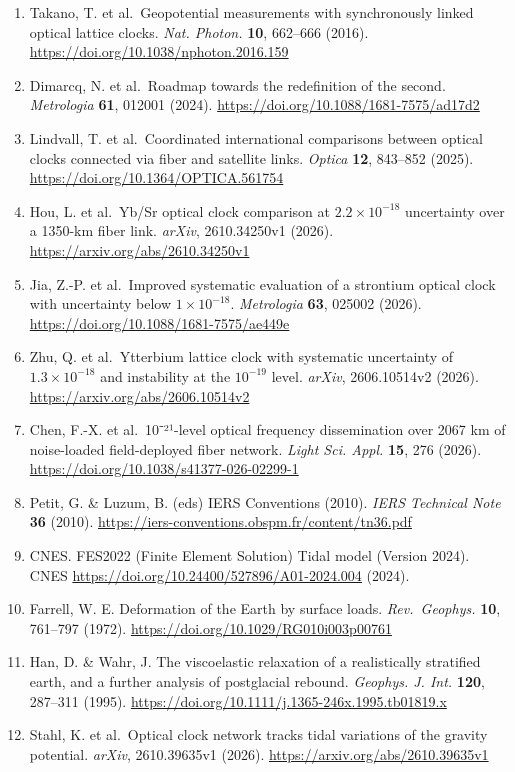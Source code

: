 \documentclass[
  12pt,
  a4paper,
]{article}
\begin{document}
\begin{enumerate}
  \url{https://doi.org/10.1038/s41567-017-0042-3}
\item
  Takano, T. et al.~Geopotential measurements with synchronously linked
  optical lattice clocks. \emph{Nat. Photon.} \textbf{10}, 662--666
  (2016). \url{https://doi.org/10.1038/nphoton.2016.159}
\item
  Dimarcq, N. et al.~Roadmap towards the redefinition of the second.
  \emph{Metrologia} \textbf{61}, 012001 (2024).
  \url{https://doi.org/10.1088/1681-7575/ad17d2}
\item
  Lindvall, T. et al.~Coordinated international comparisons between
  optical clocks connected via fiber and satellite links. \emph{Optica}
  \textbf{12}, 843--852 (2025).
  \url{https://doi.org/10.1364/OPTICA.561754}
\item
  Hou, L. et al.~Yb/Sr optical clock comparison at \(2.2\times10^{-18}\)
  uncertainty over a 1350-km fiber link. \emph{arXiv}, 2610.34250v1
  (2026). \url{https://arxiv.org/abs/2610.34250v1}
\item
  Jia, Z.-P. et al.~Improved systematic evaluation of a strontium
  optical clock with uncertainty below \(1\times10^{-18}\).
  \emph{Metrologia} \textbf{63}, 025002 (2026).
  \url{https://doi.org/10.1088/1681-7575/ae449e}
\item
  Zhu, Q. et al.~Ytterbium lattice clock with systematic uncertainty of
  \(1.3\times 10^{-18}\) and instability at the \(10^{-19}\) level.
  \emph{arXiv}, 2606.10514v2 (2026).
  \url{https://arxiv.org/abs/2606.10514v2}
\item
  Chen, F.-X. et al.~10⁻²¹-level optical frequency dissemination over
  2067 km of noise-loaded field-deployed fiber network. \emph{Light Sci.
  Appl.} \textbf{15}, 276 (2026).
  \url{https://doi.org/10.1038/s41377-026-02299-1}
\item
  Petit, G. \& Luzum, B. (eds) IERS Conventions (2010). \emph{IERS
  Technical Note} \textbf{36} (2010).
  \url{https://iers-conventions.obspm.fr/content/tn36.pdf}
\item
  CNES. FES2022 (Finite Element Solution) Tidal model (Version 2024).
  CNES \url{https://doi.org/10.24400/527896/A01-2024.004} (2024).
\item
  Farrell, W. E. Deformation of the Earth by surface loads.
  \emph{Rev.~Geophys.} \textbf{10}, 761--797 (1972).
  \url{https://doi.org/10.1029/RG010i003p00761}
\item
  Han, D. \& Wahr, J. The viscoelastic relaxation of a realistically
  stratified earth, and a further analysis of postglacial rebound.
  \emph{Geophys. J. Int.} \textbf{120}, 287--311 (1995).
  \url{https://doi.org/10.1111/j.1365-246x.1995.tb01819.x}
\item
  Stahl, K. et al.~Optical clock network tracks tidal variations of the
  gravity potential. \emph{arXiv}, 2610.39635v1 (2026).
  \url{https://arxiv.org/abs/2610.39635v1}
\end{enumerate}
\end{document}
